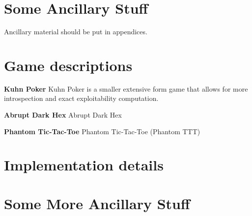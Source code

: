 \chapter{Some Ancillary Stuff}

Ancillary material should be put in appendices.

\chapter{Game descriptions}
\label{apx:gamedesc}

\textbf{Kuhn Poker}
Kuhn Poker is a smaller extensive form game that allows for more introspection and exact
exploitability computation.

\textbf{Abrupt Dark Hex}
Abrupt Dark Hex

\textbf{Phantom Tic-Tac-Toe} Phantom Tic-Tac-Toe (Phantom TTT)

\chapter{Implementation details}
\label{apx:impdet}

\chapter{Some More Ancillary Stuff}

